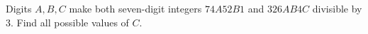 Digits $A,B,C$ make both seven-digit integers $74A52B1$ and $326AB4C$ divisible by $3$. Find all possible values of $C$.
